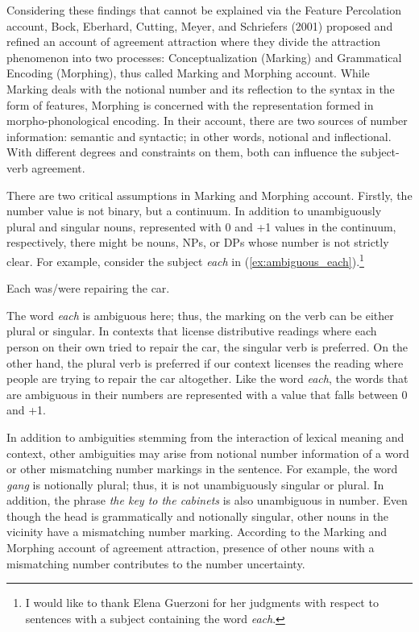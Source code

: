 Considering these findings that cannot be explained via the Feature Percolation account, Bock, Eberhard, Cutting, Meyer, and Schriefers (2001) proposed and  refined an account of agreement attraction where they divide the attraction phenomenon into two processes: Conceptualization (Marking) and Grammatical Encoding (Morphing), thus called Marking and Morphing account. While Marking deals with the notional number and its reflection to the syntax in the form of features, Morphing is concerned with the representation formed in morpho-phonological encoding. In their account, there are two sources of number information: semantic and syntactic; in other words, notional and inflectional. With different degrees and constraints on them, both can influence the subject-verb agreement. 

There are two critical assumptions in Marking and Morphing account. Firstly, the number value is not binary, but a continuum. In addition to unambiguously plural and singular nouns, represented with 0 and +1 values in the continuum, respectively, there might be nouns, NPs, or DPs whose number is not strictly clear. For example, consider the subject \emph{each} in (\ref{ex:ambiguous_each}).\footnote{I would like to thank Elena Guerzoni for her judgments with respect to sentences with a subject containing the word \emph{each}.}

\ea \label{ex:ambiguous_each} Each was/were repairing the car. \z

The word \emph{each} is ambiguous here; thus, the marking on the verb can be either plural or singular. In contexts that license distributive readings where each person on their own tried to repair the car, the singular verb is preferred. On the other hand, the plural verb is preferred if our context licenses the reading where people are trying to repair the car altogether. Like the word \emph{each}, the words that are ambiguous in their numbers are represented with a value that falls between 0 and +1. 

In addition to ambiguities stemming from the interaction of lexical meaning and context, other ambiguities may arise from notional number information of a word or other mismatching number markings in the sentence. For example, the word \emph{gang} is notionally plural; thus, it is not unambiguously singular or plural. In addition, the phrase \emph{the key to the cabinets} is also unambiguous in number. Even though the head is grammatically and notionally singular, other nouns in the vicinity have a mismatching number marking. According to the Marking and Morphing account of agreement attraction, presence of other nouns with a mismatching number contributes to the number uncertainty.

